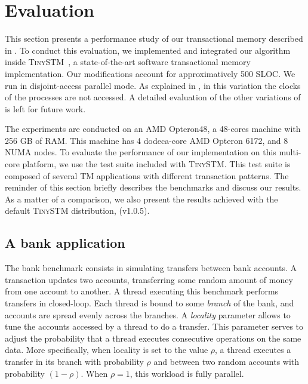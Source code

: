 \section{Evaluation}

This section presents a performance study of our \SPSER transactional memory described in .
To conduct this evaluation, we implemented and integrated our algorithm inside \textsc{TinySTM}~\cite{FelberFMR10}, a state-of-the-art software transactional memory implementation.
Our modifications account for approximatively 500 SLOC.
We run  in disjoint-access parallel mode.
As explained in , in this variation the clocks of the processes are not accessed.
A detailed evaluation of the other variations of  is left for future work.

The experiments are conducted on an AMD Opteron48, a 48-cores machine with 256 GB of RAM. 
This machine has 4 dodeca-core AMD Opteron 6172, and 8 NUMA nodes.
To evaluate the performance of our implementation on this multi-core platform, we use the test suite included with \textsc{TinySTM}.
This test suite is composed of several TM applications with different transaction patterns.
The reminder of this section briefly describes the benchmarks and discuss our results.
As a matter of a comparison, we also present the results achieved with the default \textsc{TinySTM} distribution, (v1.0.5).
 
\subsection{A bank application}

The bank benchmark consists in simulating transfers between bank accounts.
A transaction updates two accounts, transferring some random amount of money from one account to another.
A thread executing this benchmark performs transfers in closed-loop.
Each thread is bound to some \emph{branch} of the bank, and accounts are spread evenly across the branches.
A \emph{locality} parameter allows to tune the accounts accessed by a thread to do a transfer.
This parameter serves to adjust the probability that a thread executes consecutive operations on the same data.
More specifically, when locality is set to the value $\rho$, a thread executes a transfer in its branch with probability $\rho$ and between two random accounts with probability $(1-\rho)$.
When $\rho=1$, this workload is fully parallel.

